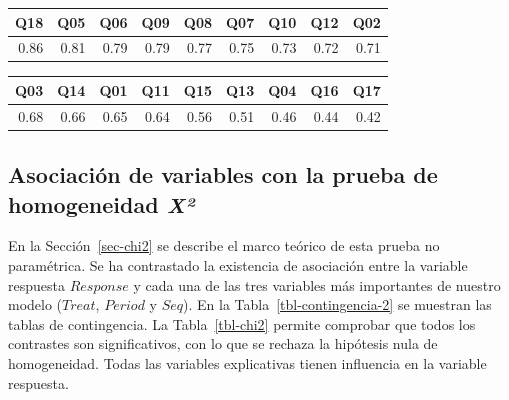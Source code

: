 \documentclass[
  12pt,
  a4paper,
  extrafontsizes,
  onecolumn,
  openright,
  table]{memoir}
\begin{document}
\begin{table}

\caption{\label{tbl-item-alpha}Relación de cada ítem con el índice alpha
de Cronbach.}\begin{minipage}[t]{\linewidth}

{\centering 

\begin{longtable}{rrrrrrrrr}
\tabularnewline

\toprule
Q18 & Q05 & Q06 & Q09 & Q08 & Q07 & Q10 & Q12 & Q02 \\ 
\midrule
0.86 & 0.81 & 0.79 & 0.79 & 0.77 & 0.75 & 0.73 & 0.72 & 0.71 \\ 
\bottomrule
\end{longtable}

}

\end{minipage}%
\newline
\begin{minipage}[t]{\linewidth}

{\centering 

\begin{longtable}{rrrrrrrrr}
\tabularnewline

\toprule
Q03 & Q14 & Q01 & Q11 & Q15 & Q13 & Q04 & Q16 & Q17 \\ 
\midrule
0.68 & 0.66 & 0.65 & 0.64 & 0.56 & 0.51 & 0.46 & 0.44 & 0.42 \\ 
\bottomrule
\end{longtable}

}

\end{minipage}%

\end{table}

\normalsize

\hypertarget{sec-chi2-2}{%
\subsection{\texorpdfstring{Asociación de variables con la prueba de
homogeneidad
\emph{X²}}{Asociación de variables con la prueba de homogeneidad X²}}\label{sec-chi2-2}}

En la Sección~\ref{sec-chi2} se describe el marco teórico de esta prueba
no paramétrica. Se ha contrastado la existencia de asociación entre la
variable respuesta \(Response\) y cada una de las tres variables más
importantes de nuestro modelo (\(Treat\), \(Period\) y \(Seq\)). En la
Tabla~\ref{tbl-contingencia-2} se muestran las tablas de contingencia.
La Tabla~\ref{tbl-chi2} permite comprobar que todos los contrastes son
significativos, con lo que se rechaza la hipótesis nula de homogeneidad.
Todas las variables explicativas tienen influencia en la variable
respuesta.
\end{document}
